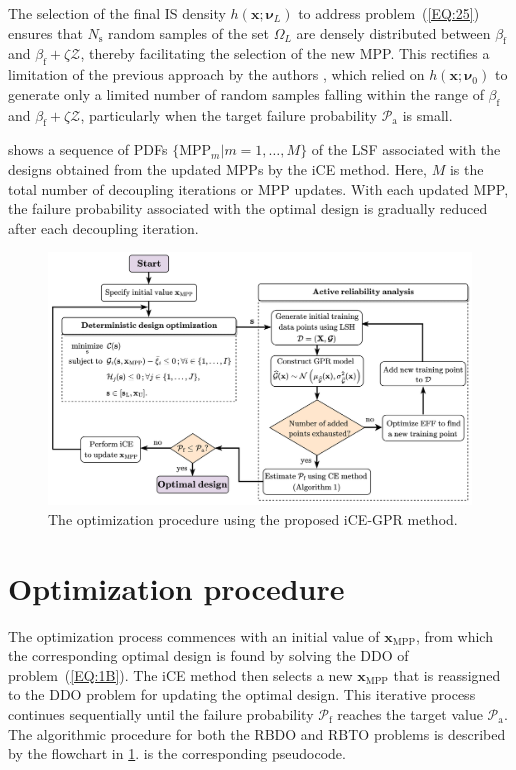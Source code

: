 \documentclass[preprint,3p]{elsarticle}
\begin{document}
\begin{linenumbers}
The selection of the final IS density ${h}\left(\textbf{x};\boldsymbol{\nu}_L\right)$ to address problem~(\ref{EQ:25}) ensures that $N_\text{s}$ random samples of the set $\Omega_L$ are densely distributed between $\beta_\text{f}$ and $\beta_\text{f}+\zeta\mathcal{Z}$, thereby facilitating the selection of the new MPP.
This rectifies a limitation of the previous approach by the authors \cite{VANHUYNH2023}, which relied on ${h}\left(\textbf{x};\boldsymbol{\nu}_0\right)$ to generate only a limited number of random samples falling within the range of $\beta_\text{f}$ and $\beta_\text{f}+\zeta\mathcal{Z}$, particularly when the target failure probability $\mathcal{P}_\text{a}$ is small.

 shows a sequence of PDFs $\{\text{MPP}_m|m=1,\dots, M\}$ of the LSF associated with the designs obtained from the updated MPPs by the iCE method. Here, $M$ is the total number of decoupling iterations or MPP updates. With each updated MPP, the failure probability associated with the optimal design is gradually reduced after each decoupling iteration.

\begin{figure}[ht!]
	\begin{center}
		\includegraphics[scale=0.8]{Fig4.jpg}
	\end{center}
	\caption{The optimization procedure using the proposed iCE-GPR method.}
	\label{FIG:4}
\end{figure}

\section{Optimization procedure}
\label{sec3}
The optimization process commences with an initial value of $\textbf{x}_\text{MPP}$, from which the corresponding optimal design is found by solving the DDO of problem~(\ref{EQ:1B}).
The iCE method then selects a new $\textbf{x}_\text{MPP}$ that is reassigned to the DDO problem for updating the optimal design.
This iterative process continues sequentially until the failure probability $\mathcal{P}_\text{f}$ reaches the target value $\mathcal{P}_\text{a}$. The algorithmic procedure for both the RBDO and RBTO problems is described by the flowchart in \cref{FIG:4}.  is the corresponding pseudocode.


\end{linenumbers}
\end{document}

